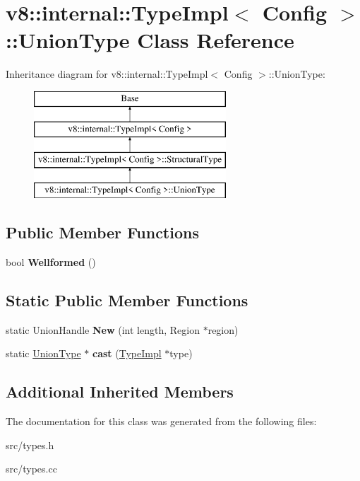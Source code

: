 \hypertarget{classv8_1_1internal_1_1_type_impl_1_1_union_type}{}\section{v8\+:\+:internal\+:\+:Type\+Impl$<$ Config $>$\+:\+:Union\+Type Class Reference}
\label{classv8_1_1internal_1_1_type_impl_1_1_union_type}
Inheritance diagram for v8\+:\+:internal\+:\+:Type\+Impl$<$ Config $>$\+:\+:Union\+Type\+:\begin{figure}[H]
\begin{center}
\leavevmode
\includegraphics[height=4.000000cm]{classv8_1_1internal_1_1_type_impl_1_1_union_type}
\end{center}
\end{figure}
\subsection*{Public Member Functions}
\begin{DoxyCompactItemize}
\item 
\hypertarget{classv8_1_1internal_1_1_type_impl_1_1_union_type_abd326ddbe61300a9813e90c3cd9bb909}{}bool {\bfseries Wellformed} ()\label{classv8_1_1internal_1_1_type_impl_1_1_union_type_abd326ddbe61300a9813e90c3cd9bb909}

\end{DoxyCompactItemize}
\subsection*{Static Public Member Functions}
\begin{DoxyCompactItemize}
\item 
\hypertarget{classv8_1_1internal_1_1_type_impl_1_1_union_type_a6b38a3561bc046ee7ab6a6dbad38aafa}{}static Union\+Handle {\bfseries New} (int length, Region $\ast$region)\label{classv8_1_1internal_1_1_type_impl_1_1_union_type_a6b38a3561bc046ee7ab6a6dbad38aafa}

\item 
\hypertarget{classv8_1_1internal_1_1_type_impl_1_1_union_type_a620e438c3c079fe5b04025bef6015ac4}{}static \hyperlink{classv8_1_1internal_1_1_type_impl_1_1_union_type}{Union\+Type} $\ast$ {\bfseries cast} (\hyperlink{classv8_1_1internal_1_1_type_impl}{Type\+Impl} $\ast$type)\label{classv8_1_1internal_1_1_type_impl_1_1_union_type_a620e438c3c079fe5b04025bef6015ac4}

\end{DoxyCompactItemize}
\subsection*{Additional Inherited Members}


The documentation for this class was generated from the following files\+:\begin{DoxyCompactItemize}
\item 
src/types.\+h\item 
src/types.\+cc\end{DoxyCompactItemize}
